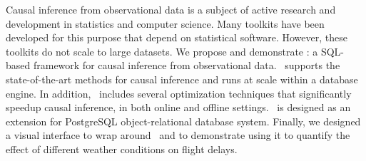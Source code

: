 Causal inference from observational data is a subject of active research and development in statistics and computer science. Many toolkits have been developed for this purpose that depend on statistical software.
However, these toolkits do not scale to large datasets.
We propose and demonstrate \GSQL: a SQL-based framework for causal inference from observational data.
\GSQL\ supports the state-of-the-art methods for causal inference and runs at scale within a database engine.
In addition, \GSQL\ includes several optimization techniques that significantly speedup causal inference, in both online and offline settings. \GSQL\ is designed as an extension for PostgreSQL object-relational database system. Finally, we designed a visual interface to wrap around \GSQL\ and to demonstrate using it to quantify the effect of different weather conditions on flight delays. 